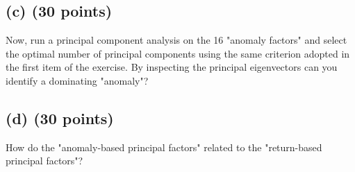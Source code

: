 \subsection{(c) (30 points)}
Now, run a principal component analysis on the 16 "anomaly factors" and select the optimal number of principal components using the same criterion adopted in the first item of the exercise. By inspecting the principal eigenvectors can you identify a dominating "anomaly"?




\subsection{(d) (30 points)}
How do the "anomaly-based principal factors" related to the "return-based principal factors"?